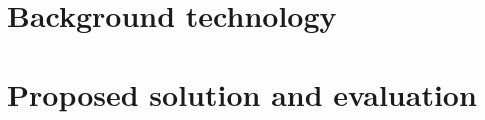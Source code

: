 










\chapter{Background technology}
\label{cha:Background technology}

\chapter{Proposed solution and evaluation}
\label{cha:proposed solution and evaluation}

